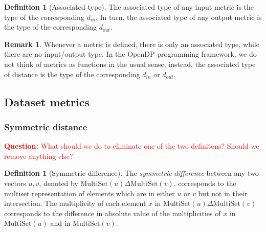 \documentclass[11pt,a4paper]{article}
\theoremstyle{definition}
\newtheorem{remark}[theorem]{Remark}
\newtheorem{definition}[theorem]{Definition}
\newcommand{\MultiSet}{\mathrm{MultiSet}}
\newcommand{\din}{d_{in}}
\newcommand{\dout}{d_{out}}
\newcommand{\questionc}[1]{\textcolor{red}{\textbf{Question:} #1}}
\newcommand{\silvia}[1]{{ {\color{blue}{(silvia)~#1}}}}
\newcommand{\connor}[1]{{ {\color{teal}{(connor)~#1}}}}
\newcommand{\todo}{{\textcolor{red}{TODO }}}
\begin{document}


\begin{definition}[Associated type]
    The associated type of any input metric is the type of the corresponding $\din$. In turn, the associated type of any output metric is the type of the corresponding $\dout$.
\end{definition}

\begin{remark}
    Whenever a metric is defined, there is only an associated type, while there are no input/output type. In the OpenDP programming framework, we do not think of metrics as functions in the usual sense; instead, the associated type of distance is the type of the corresponding $\din$ or $\dout$.
\end{remark}

\subsection{Dataset metrics}
\subsubsection{Symmetric distance}

\questionc{What should we do to eliminate one of the two definitons? Should we remove anything else?}

\begin{definition}[Symmetric difference]
The \textit{symmetric difference} between any two vectors $u, v$, denoted by $\MultiSet(u)\Delta \MultiSet(v)$, corresponds to the multiset representation of elements which are in either $u$ or $v$ but not in their intersection. The multiplicity of each element $x$ in $\MultiSet(u)\Delta \MultiSet(v)$ corresponds to the difference in absolute value of the multiplicities of $x$ in $\MultiSet(u)$ and in $\MultiSet(v)$.


\end{definition}
\end{document}
